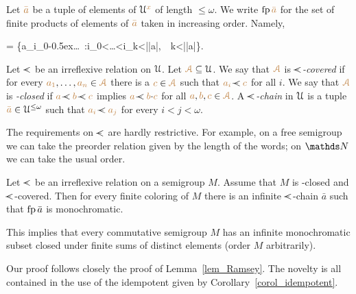Let ${\color{brown}\bar a}$ be a tuple of elements of $\EuScript U^{\color{brown} x}$ of length $\le\omega$.
We write ${\rm fp}\,{\color{brown}\bar a}$ for the set of finite products of elements 
of ${\color{brown}\bar a}$ taken in increasing order. 
Namely, 

{=}
{\Big\{{\mr a_{i_0}}\kern-0.5ex\cdot\dots{}\ :\quad i_0<\dots<i_k<|{\mr\bar a}|,\ \ k<|{\mr\bar a}|\Big\}}. 

% 
% 

Let \emph{$\cpaw$\/} be an irreflexive relation on $\EuScript U$.
Let ${\color{brown}\EuScript A}\subseteq\EuScript U$.
We say that ${\color{brown}\EuScript A}$ is \emph{$\cpaw$-covered\/} 
if for every ${\color{brown} a_1},\dots,{\color{brown} a_n}\in{\color{brown}\EuScript A}$ there is a ${\color{brown} c}\in{\color{brown}\EuScript A}$ such that ${\mr a_i}\cpaw{\mr c}$ for all $i$.
We say that ${\color{brown}\EuScript A}$ is \emph{\cpawdot-closed\/} 
if ${\mr a}\cpaw{\mr b}\cpaw{\mr c}$ implies ${\mr a}\cpaw{\mr b}{\cdot}{\mr c}$ 
for all ${\color{brown} a},{\color{brown} b},{\color{brown} c}\in{\color{brown}\EuScript A}$.
A \emph{$\cpaw$-chain\/} in $\EuScript U$ is a tuple ${\color{brown}\bar a}\in\EuScript U^{\le\omega}$ such that ${\mr a_i}\cpaw{\mr a_j}$ for every $i<j<\omega$.

The requirements on  $\cpaw$ are hardly restrictive.
For example, on a free semigroup we can take the preorder relation given by the length of the words; on $\NN$ we can take the usual order.
%

\begin{void}\label{thm_Hindman}
Let $\cpaw$ be an irreflexive relation on a semigroup $M$.
%
Assume that $M$ is \cpawdot-closed and $\cpaw$-covered.
%
Then for every finite coloring of $M$ 
there is an infinite $\cpaw$-chain $\bar a$ such that ${\rm fp}\,\bar a$ is monochromatic.
\end{void}

This implies that every commutative semigroup $M$ has an infinite monochromatic subset closed under finite sums of distinct elements (order $M$ arbitrarily).

Our proof follows closely the proof of Lemma~\ref{lem_Ramsey}.
%
The novelty is all contained in the use of the idempotent given by Corollary~\ref{corol_idempotent}.

